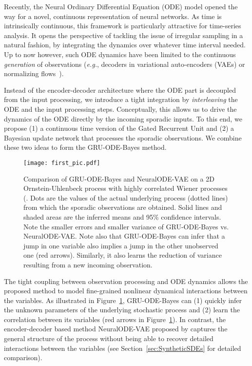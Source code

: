 \documentclass{article}
\newcommand{\method}{GRU-ODE-Bayes}
\begin{document}
Recently, the Neural Ordinary Differential Equation (ODE) model \citep{neural_ode} opened the way for a novel, continuous representation of neural networks. As time is intrinsically continuous, this framework is particularly attractive for time-series analysis. It opens the perspective of tackling the issue of irregular sampling in a natural fashion, by integrating the dynamics over whatever time interval needed. Up to now however, such ODE dynamics have been limited to the continuous \emph{generation} of observations (\emph{e.g.}, decoders in variational auto-encoders (VAEs) \citep{kingma2013auto} or normalizing flows~\citep{rezende2014stochastic}). 

Instead of the encoder-decoder architecture where the ODE part is decoupled from the input processing, we introduce a tight integration by \emph{interleaving} the ODE and the input processing steps. Conceptually, this allows us to drive the dynamics of the ODE directly by the incoming sporadic inputs. To this end, we propose (1) a continuous time version of the Gated Recurrent Unit and (2) a Bayesian update network that processes the sporadic observations. We combine these two ideas to form the \method{} method.




\begin{figure}[tbh]
\vskip 0.0in
\begin{center}
\centerline{\texttt{[image: first\_pic.pdf]}}
\caption{Comparison of GRU-ODE-Bayes and NeuralODE-VAE on a 2D Ornstein-Uhlenbeck process with highly correlated Wiener processes (. Dots are the values of the actual underlying process (dotted lines) from which the sporadic observations are obtained. Solid lines and shaded areas are the inferred means and 95\% confidence intervals. Note the smaller errors and smaller variance of GRU-ODE-Bayes vs. NeuralODE-VAE. Note also that GRU-ODE-Bayes can infer that a jump in one variable also implies a jump in the other unobserved one (red arrows). Similarly, it also learns the reduction of variance resulting from a new incoming observation.}
\label{fig:comparison}
\end{center}
\vskip -0.2in
\end{figure}


The tight coupling between observation processing and ODE dynamics allows the proposed method to model fine-grained nonlinear dynamical interactions between the variables. As illustrated in Figure~\ref{fig:comparison}, \method{} can (1) quickly infer the unknown parameters of the underlying stochastic process and (2) learn the correlation between its variables (red arrows in Figure~\ref{fig:comparison}). 
In contrast, the encoder-decoder based method NeuralODE-VAE proposed by \citet{neural_ode} captures the general structure of the process without being able to recover detailed interactions between the variables (see Section~\ref{sec:SyntheticSDEs} for detailed comparison).
\end{document}
